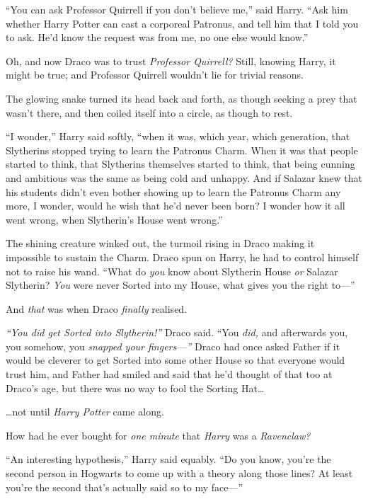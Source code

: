 ``You can ask Professor Quirrell if you don't believe me,'' said Harry.
``Ask him whether Harry Potter can cast a corporeal Patronus, and tell
him that I told you to ask. He'd know the request was from me, no one
else would know.''

Oh, and now Draco was to trust \emph{Professor Quirrell?} Still, knowing
Harry, it might be true; and Professor Quirrell wouldn't lie for trivial
reasons.

The glowing snake turned its head back and forth, as though seeking a
prey that wasn't there, and then coiled itself into a circle, as though
to rest.

``I wonder,'' Harry said softly, ``when it was, which year, which
generation, that Slytherins stopped trying to learn the Patronus Charm.
When it was that people started to think, that Slytherins themselves
started to think, that being cunning and ambitious was the same as being
cold and unhappy. And if Salazar knew that his students didn't even
bother showing up to learn the Patronus Charm any more, I wonder, would
he wish that he'd never been born? I wonder how it all went wrong, when
Slytherin's House went wrong.''

The shining creature winked out, the turmoil rising in Draco making it
impossible to sustain the Charm. Draco spun on Harry, he had to control
himself not to raise his wand. ``What do \emph{you} know about Slytherin
House \emph{or} Salazar Slytherin? \emph{You} were never Sorted into my
House, what gives you the right to---''

And \emph{that} was when Draco \emph{finally} realised.

\emph{``You did get Sorted into Slytherin!''} Draco said. ``You
\emph{did,} and afterwards you, you somehow, you \emph{snapped your
fingers---''} Draco had once asked Father if it would be cleverer to get
Sorted into some other House so that everyone would trust him, and
Father had smiled and said that he'd thought of that too at Draco's age,
but there was no way to fool the Sorting Hat\ldots{}

\ldots{}not until \emph{Harry Potter} came along.

How had he ever bought for \emph{one minute} that \emph{Harry} was a
\emph{Ravenclaw?}

``An interesting hypothesis,'' Harry said equably. ``Do you know, you're
the second person in Hogwarts to come up with a theory along those
lines? At least you're the second that's actually said so to my
face---''

